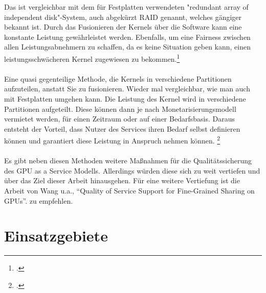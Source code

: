 \documentclass[12pt,toc=bib,toc=listof]{scrreprt}
\begin{document}
Das ist vergleichbar mit dem für Festplatten verwendeten "redundant array of independent disk"-System, auch abgekürzt RAID genannt, 
welches gängiger bekannt ist. Durch das Fusionieren der Kernels über die Software kann eine 
konstante Leistung gewährleistet werden.
Ebenfalls, um eine Fairness zwischen allen Leistungsabnehmern zu schaffen, 
da es keine Situation geben kann, einen leistungsschwächeren Kernel zugewiesen zu bekommen.\footcite [Vgl.] [] {Wang.2017}
\\ \\
Eine quasi gegenteilige Methode, die Kernels in verschiedene Partitionen aufzuteilen, anstatt Sie zu fusionieren.
Wieder mal vergleichbar, wie man auch mit Festplatten umgehen kann. Die Leistung des Kernel wird 
in verschiedene Partitionen aufgeteilt. Diese können dann je nach Monetarisierungsmodell 
vermietet werden, für einen Zeitraum oder auf einer Bedarfsbasis. Daraus entsteht der Vorteil, 
dass Nutzer des Services ihren Bedarf selbst definieren können und garantiert diese Leistung 
in Anspruch nehmen können. \footcite [Vgl.] [] {Wang.2017}
\\ \\
Es gibt neben diesen Methoden weitere Maßnahmen für die Qualitätssicherung des GPU as a Service Modells. 
Allerdings würden diese sich zu weit vertiefen und über das Ziel dieser Arbeit hinausgehen. 
Für eine weitere Vertiefung ist die Arbeit von Wang u.a., “Quality of Service Support for Fine-Grained Sharing on GPUs”. zu empfehlen.

\section{Einsatzgebiete}
\label{sec: Einsatzgebiete}

\end{document}
